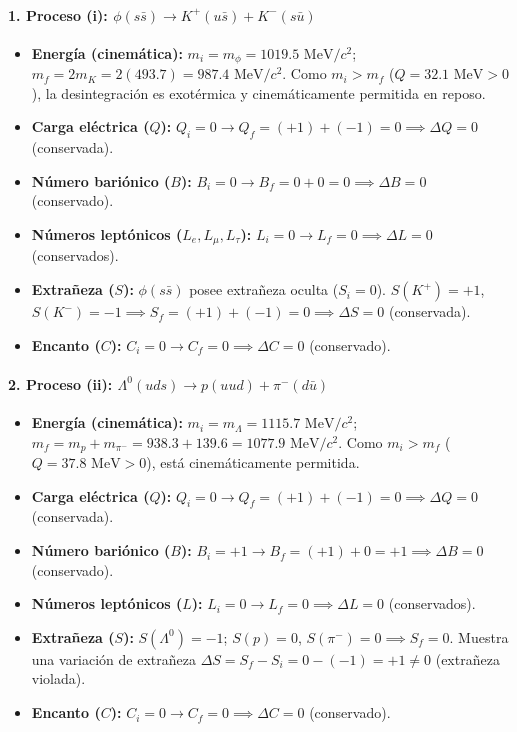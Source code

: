 \begin{problema}
\paragraph{1. Proceso (i): $\phi(s\bar{s}) \longrightarrow K^+(u\bar{s}) + K^-(s\bar{u})$}
\begin{itemize}
    \item \textbf{Energía (cinemática):} $m_i = m_\phi = 1019.5\text{ MeV}/c^2$; $m_f = 2 m_K = 2(493.7) = 987.4\text{ MeV}/c^2$. Como $m_i > m_f$ ($Q = 32.1\text{ MeV} > 0$), la desintegración es exotérmica y cinemáticamente permitida en reposo.
    \item \textbf{Carga eléctrica ($Q$):} $Q_i = 0 \to Q_f = (+1) + (-1) = 0 \implies \Delta Q = 0$ (conservada).
    \item \textbf{Número bariónico ($B$):} $B_i = 0 \to B_f = 0 + 0 = 0 \implies \Delta B = 0$ (conservado).
    \item \textbf{Números leptónicos ($L_e, L_\mu, L_\tau$):} $L_i = 0 \to L_f = 0 \implies \Delta L = 0$ (conservados).
    \item \textbf{Extrañeza ($S$):} $\phi(s\bar{s})$ posee extrañeza oculta ($S_i = 0$). $S(K^+) = +1$, $S(K^-) = -1 \implies S_f = (+1) + (-1) = 0 \implies \Delta S = 0$ (conservada).
    \item \textbf{Encanto ($C$):} $C_i = 0 \to C_f = 0 \implies \Delta C = 0$ (conservado).
\end{itemize}

\paragraph{2. Proceso (ii): $\Lambda^0(uds) \longrightarrow p(uud) + \pi^-(d\bar{u})$}
\begin{itemize}
    \item \textbf{Energía (cinemática):} $m_i = m_\Lambda = 1115.7\text{ MeV}/c^2$; $m_f = m_p + m_{\pi^-} = 938.3 + 139.6 = 1077.9\text{ MeV}/c^2$. Como $m_i > m_f$ ($Q = 37.8\text{ MeV} > 0$), está cinemáticamente permitida.
    \item \textbf{Carga eléctrica ($Q$):} $Q_i = 0 \to Q_f = (+1) + (-1) = 0 \implies \Delta Q = 0$ (conservada).
    \item \textbf{Número bariónico ($B$):} $B_i = +1 \to B_f = (+1) + 0 = +1 \implies \Delta B = 0$ (conservado).
    \item \textbf{Números leptónicos ($L$):} $L_i = 0 \to L_f = 0 \implies \Delta L = 0$ (conservados).
    \item \textbf{Extrañeza ($S$):} $S(\Lambda^0) = -1$; $S(p) = 0$, $S(\pi^-) = 0 \implies S_f = 0$. Muestra una variación de extrañeza $\Delta S = S_f - S_i = 0 - (-1) = +1 \neq 0$ (extrañeza violada).
    \item \textbf{Encanto ($C$):} $C_i = 0 \to C_f = 0 \implies \Delta C = 0$ (conservado).
\end{itemize}


\end{problema}
